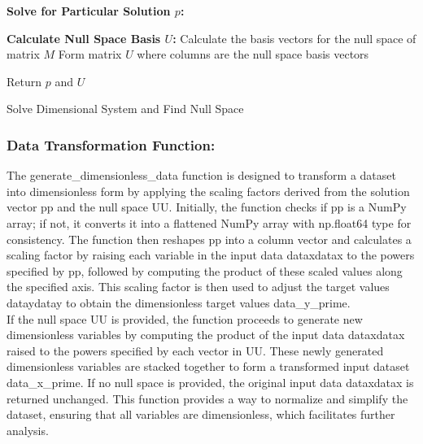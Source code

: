 \documentclass{article}
\begin{document}
\begin{algorithm}[H]
\SetAlgoLined
{}

\textbf{Solve for Particular Solution \(p\):}\;

\textbf{Calculate Null Space Basis \(U\):}\;
Calculate the basis vectors for the null space of matrix \(M\)\;
Form matrix \(U\) where columns are the null space basis vectors\;

Return \(p\) and \(U\)\;

\caption{Solve Dimensional System and Find Null Space}
\label{alg:solve_dimension} %
\end{algorithm}






\subsubsection{Data Transformation Function:}

The generate_dimensionless_data function is designed to transform a dataset into dimensionless form by applying the scaling factors derived from the solution vector pp and the null space UU. Initially, the function checks if pp is a NumPy array; if not, it converts it into a flattened NumPy array with np.float64 type for consistency. The function then reshapes pp into a column vector and calculates a scaling factor by raising each variable in the input data dataxdatax​ to the powers specified by pp, followed by computing the product of these scaled values along the specified axis. This scaling factor is then used to adjust the target values dataydatay​ to obtain the dimensionless target values data_y_prime.\\

If the null space UU is provided, the function proceeds to generate new dimensionless variables by computing the product of the input data dataxdatax​ raised to the powers specified by each vector in UU. These newly generated dimensionless variables are stacked together to form a transformed input dataset data_x_prime. If no null space is provided, the original input data dataxdatax​ is returned unchanged. This function provides a way to normalize and simplify the dataset, ensuring that all variables are dimensionless, which facilitates further analysis.\\
\end{document}
